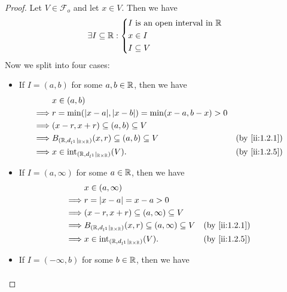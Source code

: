 \begin{proof}
  Let \(V \in \mathcal{F}_o\) and let \(x \in V\).
  Then we have
  \[
    \exists I \subseteq \mathbb{R} : \begin{dcases}
      I \text{ is an open interval in } \mathbb{R} \\
      x \in I                              \\
      I \subseteq V
    \end{dcases}
  \]
  Now we split into four cases:
  \begin{itemize}
    \item If \(I = (a, b)\) for some \(a, b \in \mathbb{R}\), then we have
          \begin{align*}
                     & x \in (a, b)                                                                         \\
            \implies & r = \min(\abs{x - a}, \abs{x - b}) = \min(x - a, b - x) > 0                          \\
            \implies & (x - r, x + r) \subseteq (a, b) \subseteq V                                          \\
            \implies & B_{(\R, d_{l^1}|_{\R \times \R})}(x, r) \subseteq (a, b) \subseteq V &  & \by{ii:1.2.1} \\
            \implies & x \in \text{int}_{(\R, d_{l^1}|_{\R \times \R})}(V).                 &  & \by{ii:1.2.5}
          \end{align*}
    \item If \(I = (a, \infty)\) for some \(a \in \mathbb{R}\), then we have
          \begin{align*}
                     & x \in (a, \infty)                                                                         \\
            \implies & r = \abs{x - a} = x - a > 0                                                               \\
            \implies & (x - r, x + r) \subseteq (a, \infty) \subseteq V                                          \\
            \implies & B_{(\R, d_{l^1}|_{\R \times \R})}(x, r) \subseteq (a, \infty) \subseteq V &  & \by{ii:1.2.1} \\
            \implies & x \in \text{int}_{(\R, d_{l^1}|_{\R \times \R})}(V).                      &  & \by{ii:1.2.5}
          \end{align*}
    \item If \(I = (-\infty, b)\) for some \(b \in \mathbb{R}\), then we have
          \begin{align*}

\end{align*}
\end{itemize}
\end{proof}
